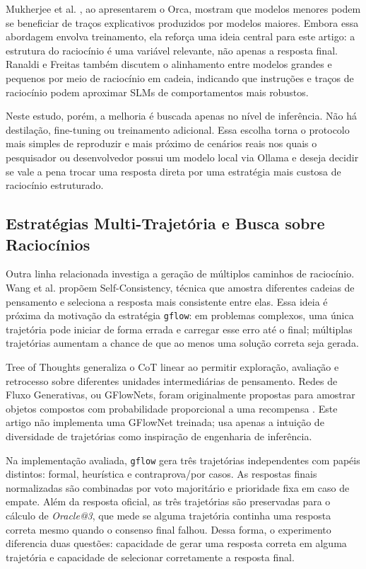 \documentclass[12pt]{article}
\begin{document}
Mukherjee et al. \cite{mukherjee2023}, ao apresentarem o Orca, mostram que modelos menores podem se beneficiar de traços explicativos produzidos por modelos maiores. Embora essa abordagem envolva treinamento, ela reforça uma ideia central para este artigo: a estrutura do raciocínio é uma variável relevante, não apenas a resposta final. Ranaldi e Freitas \cite{ranaldi2024} também discutem o alinhamento entre modelos grandes e pequenos por meio de raciocínio em cadeia, indicando que instruções e traços de raciocínio podem aproximar SLMs de comportamentos mais robustos.

Neste estudo, porém, a melhoria é buscada apenas no nível de inferência. Não há destilação, fine-tuning ou treinamento adicional. Essa escolha torna o protocolo mais simples de reproduzir e mais próximo de cenários reais nos quais o pesquisador ou desenvolvedor possui um modelo local via Ollama e deseja decidir se vale a pena trocar uma resposta direta por uma estratégia mais custosa de raciocínio estruturado.

\subsection{Estratégias Multi-Trajetória e Busca sobre Raciocínios}

Outra linha relacionada investiga a geração de múltiplos caminhos de raciocínio. Wang et al. \cite{wang2022selfconsistency} propõem Self-Consistency, técnica que amostra diferentes cadeias de pensamento e seleciona a resposta mais consistente entre elas. Essa ideia é próxima da motivação da estratégia \texttt{gflow}: em problemas complexos, uma única trajetória pode iniciar de forma errada e carregar esse erro até o final; múltiplas trajetórias aumentam a chance de que ao menos uma solução correta seja gerada.

Tree of Thoughts \cite{yao2023tot} generaliza o CoT linear ao permitir exploração, avaliação e retrocesso sobre diferentes unidades intermediárias de pensamento. Redes de Fluxo Generativas, ou GFlowNets, foram originalmente propostas para amostrar objetos compostos com probabilidade proporcional a uma recompensa \cite{bengio2021}. Este artigo não implementa uma GFlowNet treinada; usa apenas a intuição de diversidade de trajetórias como inspiração de engenharia de inferência.

Na implementação avaliada, \texttt{gflow} gera três trajetórias independentes com papéis distintos: formal, heurística e contraprova/por casos. As respostas finais normalizadas são combinadas por voto majoritário e prioridade fixa em caso de empate. Além da resposta oficial, as três trajetórias são preservadas para o cálculo de \textit{Oracle@3}, que mede se alguma trajetória continha uma resposta correta mesmo quando o consenso final falhou. Dessa forma, o experimento diferencia duas questões: capacidade de gerar uma resposta correta em alguma trajetória e capacidade de selecionar corretamente a resposta final.
\end{document}
